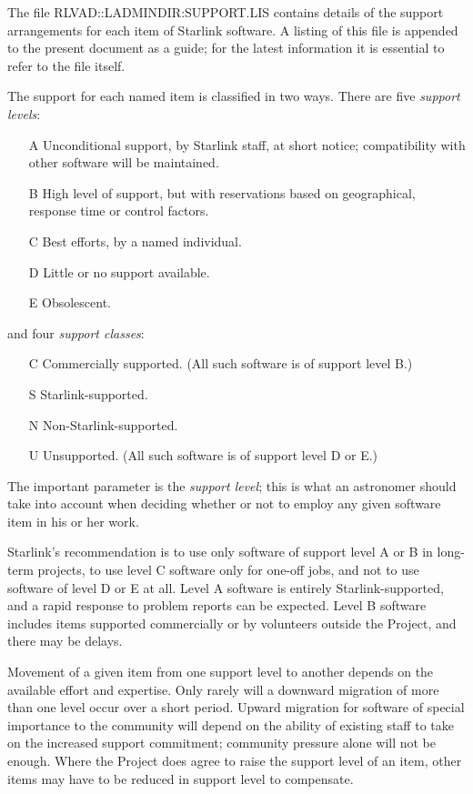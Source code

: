 The file RLVAD::LADMINDIR:SUPPORT.LIS contains details of the support
arrangements for each item of Starlink software.  A listing of this
file is appended to the present document as a guide;  for the latest
information it is essential to refer to the file itself.

The support for each named item is classified in two ways.  There are
five {\it support levels}:
\begin{enumerate}
\item[A] Unconditional support, by Starlink staff, at short
notice;  compatibility with other software will be maintained.
\item[B] High level of support, but with reservations based on
geographical, response time or control factors.
\item[C] Best efforts, by a named individual.
\item[D] Little or no support available.
\item[E] Obsolescent.
\end{enumerate}
and four {\it support classes}:
\begin{enumerate}
\item[C] Commercially supported.  (All such software is of support level B.)
\item[S] Starlink-supported.
\item[N] Non-Starlink-supported.
\item[U] Unsupported.  (All such software is of support level D or E.)
\end{enumerate}
The important parameter is the {\it support level};  this is what an
astronomer should take into account when deciding whether or not
to employ any given software item in his or her work.

Starlink's recommendation is to use only software of support level
A or B in long-term projects, to use level C software only for
one-off jobs, and not to use software of level D or E at all.
Level A software is entirely Starlink-supported, and a rapid
response to problem reports can be expected.  Level B software
includes items supported commercially or by volunteers outside
the Project, and there may be delays.

Movement of a given item from one support level to another depends
on the available effort and expertise.  Only rarely will
a downward migration of more than one level occur over a short
period.  Upward migration for software of special importance
to the community will depend on the ability of
existing staff to take on the increased support commitment;
community pressure alone will not be enough.  Where the
Project does agree to raise the support level of an item,
other items may have to be reduced in support level to compensate.

